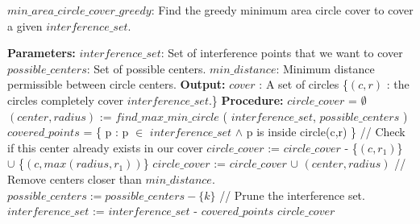 \begin{algorithm}[!htb]
\caption{\textbf{$min\_area\_circle\_cover\_greedy$}: Find the greedy minimum area circle cover to cover a given $interference\_set$.}
\begin{algorithmic}
\State \textbf{Parameters:}
\State \tab $interference\_set$: Set of interference points that we want to cover
\State \tab $possible\_centers$: Set of possible centers.  
\State \tab $min\_distance$: Minimum distance permissible between circle centers. 
\State \textbf{Output:}
\State \tab $cover$ : A set of circles \{$(c,r)$ :  the circles completely 
\State \tab \tab cover $interference\_set$.\}
\State \textbf{Procedure:}
\State
\State $circle\_cover$ = $\emptyset$
\State $(center,radius)$ := $find\_max\_min\_circle$ ( $interference\_set$, 
\State \tab \tab \tab $possible\_centers$ )
\State $covered\_points$ = \{ p : p $\in$ $interference\_set$ $\wedge$ p is inside circle(c,r) \}
\State // Check if this center already exists in our cover
\State  	$circle\_cover$ := $circle\_cover$ - \{$(c,r_1)$\} $\cup$ \{$(c,max(radius,r_1))$\}
\Else 
\State 	$circle\_cover$ := $circle\_cover$ $\cup$ $(center,radius)$
\EndIf
{} 
\State // Remove centers closer than $min\_distance$.
\State $possible\_centers := possible\_centers - \{k\}$
\EndIf
\EndFor
\State // Prune the interference set.
\State $interference\_set$ := $interference\_set$ - $covered\_points$
\EndWhile
\State \Return $circle\_cover$
\end{algorithmic}
\end{algorithm}


